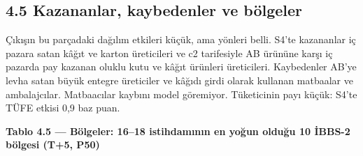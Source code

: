 \hypertarget{nace_kartlar_16-18-45-kazananlar-kaybedenler-ve-buxf6lgeler}{%
\subsection{4.5 Kazananlar, kaybedenler ve bölgeler}\label{nace_kartlar_16-18-45-kazananlar-kaybedenler-ve-buxf6lgeler}}

Çıkışın bu parçadaki dağılım etkileri küçük, ama yönleri belli. S4'te kazananlar iç pazara satan kâğıt ve karton üreticileri ve c2 tarifesiyle AB ürününe karşı iç pazarda pay kazanan oluklu kutu ve kâğıt ürünleri üreticileri. Kaybedenler AB'ye levha satan büyük entegre üreticiler ve kâğıdı girdi olarak kullanan matbaalar ve ambalajcılar. Matbaacılar kaybını model göremiyor. Tüketicinin payı küçük: S4'te TÜFE etkisi 0,9 baz puan.


\textbf{Tablo 4.5 --- Bölgeler: 16--18 istihdamının en yoğun olduğu 10 İBBS-2 bölgesi (T+5, P50)}

\nopagebreak[4]

\begingroup\gbtablo\footnotesize

